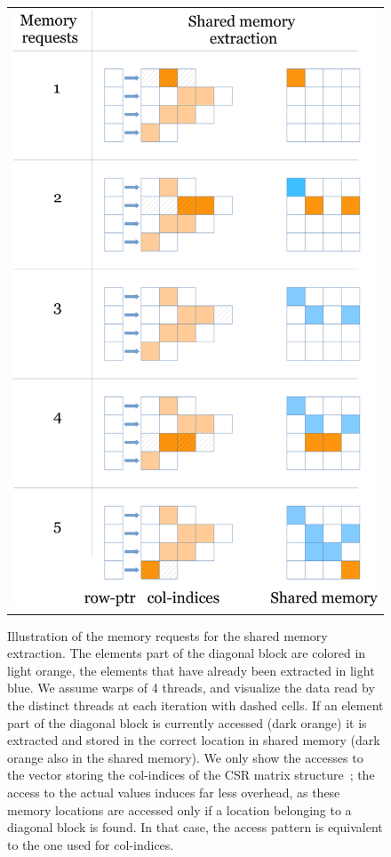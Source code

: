 \begin{figure}
\begin{center}
\begin{tabular}{c}
\includegraphics[width=.65\columnwidth]{plots/extraction}
\end{tabular}
\end{center}
\caption{Illustration of the memory requests for the shared memory extraction.
The elements part of the diagonal block are colored in light orange, the elements that have already been extracted in light blue.
We assume warps of 4 threads, and visualize the data read by the distinct threads at each iteration with dashed cells.
If an element part of the diagonal block is currently accessed (dark orange) it is extracted and stored in the correct location
in shared memory (dark orange also in the shared memory).
We only show the accesses to the vector storing the {\sf col-indices} of the CSR matrix structure~\cite{saad}; 
the access to the actual values induces far less overhead,
as these memory locations are accessed only if a location belonging to a diagonal block is found.
In that case, the access pattern is equivalent to the one used for {\sf col-indices}.
}
\label{2017-lu-block-jacobi:fig:extraction}
\end{figure}
